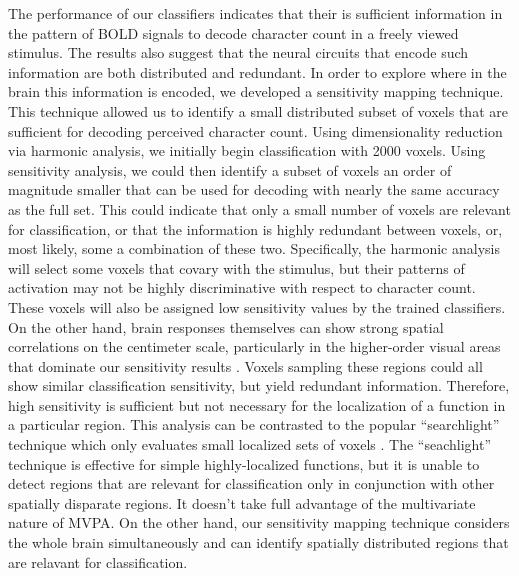 \documentclass[preprint,5p,authoryear]{elsarticle}
\begin{document}
The performance of our classifiers indicates that their is sufficient information in the pattern of BOLD signals to decode character count in a freely viewed stimulus. 
The results also suggest that the neural circuits that encode such information are both distributed and redundant.
In order to explore where in the brain this information is encoded, we developed a sensitivity mapping technique.
This technique allowed us to identify a small distributed subset of voxels that are sufficient for decoding perceived character count.
Using dimensionality reduction via harmonic analysis, we initially begin classification with 2000 voxels.
Using sensitivity analysis, we could then identify a subset of voxels an order of magnitude smaller that can be used for decoding with nearly the same accuracy as the full set.
This could indicate that only a small number of voxels are relevant for classification, or that the information is highly redundant between voxels, or, most likely, some a combination of these two.
Specifically, the harmonic analysis will select some voxels that covary with the stimulus, but their patterns of activation may not be highly discriminative with respect to character count.
These voxels will also be assigned low sensitivity values by the trained classifiers.
On the other hand, brain responses themselves can show strong spatial correlations on the centimeter scale, particularly in the higher-order visual areas that dominate our sensitivity results \citep{Engel1997}. 
Voxels sampling these regions could all show similar classification sensitivity, but yield redundant information.
Therefore, high sensitivity is sufficient but not necessary for the localization of a function in a particular region.
This analysis can be contrasted to the popular ``searchlight'' technique which only evaluates small localized sets of voxels \citep{Kriegeskorte2006}.
The ``seachlight'' technique is effective for simple highly-localized functions, but it is unable to detect regions that are relevant for classification only in conjunction with other spatially disparate regions.
It doesn't take full advantage of the multivariate nature of MVPA.
On the other hand, our sensitivity mapping technique considers the whole brain simultaneously and can identify spatially distributed regions that are relavant for classification.
\end{document}
